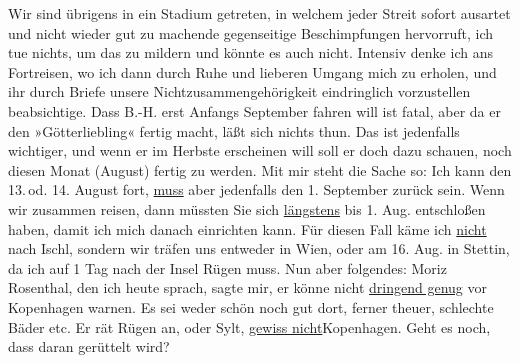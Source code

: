 \begin{ledgroupsized}[t]{13cm}
               Wir sind übrigens in ein Stadium getreten, in welchem jeder Streit sofort ausartet
               und nicht wieder gut zu machende gegenseitige Beschimpfungen hervorruft, ich tue
               nichts, um das zu mildern {\pb}und könnte es auch nicht. Intensiv denke ich ans Fortreisen, wo ich dann durch Ruhe
               und lieberen Umgang mich zu erholen, und ihr durch Briefe unsere
               Nichtzusammengehörigkeit eindringlich vorzustellen beabsichtige. Dass B.-H. erst Anfangs September
               fahren will ist fatal, aber da er den »Götterliebling« fertig macht, läßt sich nichts thun. Das ist jedenfalls
               wichtiger, und wenn er im Herbste erscheinen will soll er doch dazu schauen, noch
               diesen Monat (August) fertig zu werden. Mit mir steht die Sache so: Ich kann den
                  13. od. 14. August fort, \uline{muss} aber
               jedenfalls den 1. September zurück sein. Wenn wir zusammen reisen, dann müssten Sie
               sich \uline{längstens} bis 1. Aug. entschloßen haben, damit
               ich mich danach einrichten kann. Für diesen Fall käme ich \uline{nicht} nach Ischl, sondern wir träfen uns
               entweder in Wien, oder am 16. Aug. in Stettin, da ich auf 1 Tag nach der Insel Rügen muss. \pend
           \pstart
           Nun aber folgendes: Moriz Rosenthal, den ich
               heute sprach, sagte mir, er könne nicht \uline{dringend
                  genug} vor Kopenhagen warnen. Es sei
               weder schön noch gut dort, ferner theuer, schlechte Bäder etc. Er rät Rügen an, oder Sylt, \uline{gewiss nicht}Kopenhagen. Geht es noch, dass daran gerüttelt
               wird? \pend

\end{ledgroupsized}
